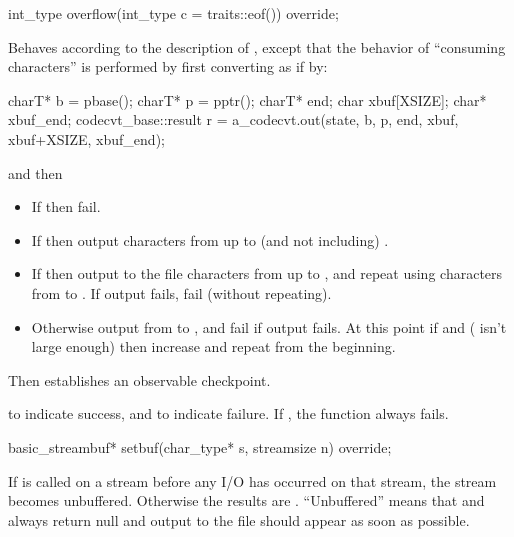 %
\begin{itemdecl}
int_type overflow(int_type c = traits::eof()) override;
\end{itemdecl}

\begin{itemdescr}
\pnum
\effects
Behaves according to the description of
,
except that the behavior of ``consuming characters'' is performed by first
converting as if by:
\begin{codeblock}
charT* b = pbase();
charT* p = pptr();
charT* end;
char   xbuf[XSIZE];
char*  xbuf_end;
codecvt_base::result r =
  a_codecvt.out(state, b, p, end, xbuf, xbuf+XSIZE, xbuf_end);
\end{codeblock}
and then
\begin{itemize}
\item If  then fail.
\item If  then output characters from
 up to (and not including) .
\item If  then output to the file characters from
 up to , and repeat using characters from
 to . If output fails, fail (without repeating).
\item Otherwise output from  to , and fail if output fails.
At this point if  and  ( isn't large
enough) then increase  and repeat from the beginning.
\end{itemize}
Then establishes an observable checkpoint.

\pnum
\returns
{}
to indicate success, and
to indicate failure.
If
,
the function always fails.
\end{itemdescr}

%
\begin{itemdecl}
basic_streambuf* setbuf(char_type* s, streamsize n) override;
\end{itemdecl}

\begin{itemdescr}
\pnum
\effects
If
is called on a stream before any I/O has occurred on that stream, the
stream becomes unbuffered.
Otherwise the results are .
``Unbuffered'' means that
and
always return null
and output to the file should appear as soon as possible.
\end{itemdescr}

